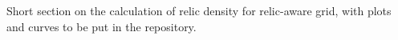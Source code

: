 Short section on the calculation of relic density for relic-aware grid, with plots and curves to be put in the repository. 